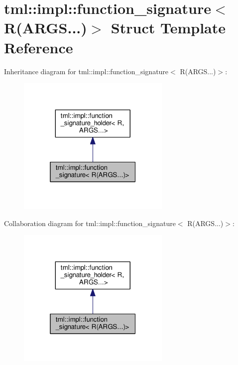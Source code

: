 \hypertarget{structtml_1_1impl_1_1function__signature_3_01_r_07_a_r_g_s_8_8_8_08_4}{\section{tml\+:\+:impl\+:\+:function\+\_\+signature$<$ R(A\+R\+G\+S...)$>$ Struct Template Reference}
\label{structtml_1_1impl_1_1function__signature_3_01_r_07_a_r_g_s_8_8_8_08_4}
}


Inheritance diagram for tml\+:\+:impl\+:\+:function\+\_\+signature$<$ R(A\+R\+G\+S...)$>$\+:
\nopagebreak
\begin{figure}[H]
\begin{center}
\leavevmode
\includegraphics[width=208pt]{structtml_1_1impl_1_1function__signature_3_01_r_07_a_r_g_s_8_8_8_08_4__inherit__graph}
\end{center}
\end{figure}


Collaboration diagram for tml\+:\+:impl\+:\+:function\+\_\+signature$<$ R(A\+R\+G\+S...)$>$\+:
\nopagebreak
\begin{figure}[H]
\begin{center}
\leavevmode
\includegraphics[width=208pt]{structtml_1_1impl_1_1function__signature_3_01_r_07_a_r_g_s_8_8_8_08_4__coll__graph}
\end{center}
\end{figure}
